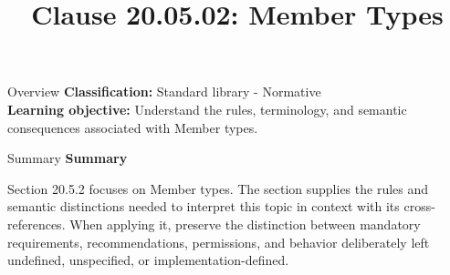 \documentclass[10pt,letterpaper]{article}
\title{Clause 20.05.02: Member Types}
\author{}
\date{}
\begin{document}
\maketitle
\begin{CornellOverviewBox}{Overview}
\textbf{Classification:} Standard library - Normative\\[2pt]
\textbf{Learning objective:} Understand the rules, terminology, and semantic consequences associated with Member types.
\end{CornellOverviewBox}\begin{CornellSummaryBox}{Summary}
{\sffamily\bfseries\color{Accent} Summary}\par\vspace{3pt}Section 20.5.2 focuses on Member types. The section supplies the rules and semantic distinctions needed to interpret this topic in context with its cross-references. When applying it, preserve the distinction between mandatory requirements, recommendations, permissions, and behavior deliberately left undefined, unspecified, or implementation-defined.
\end{CornellSummaryBox}
\end{document}
